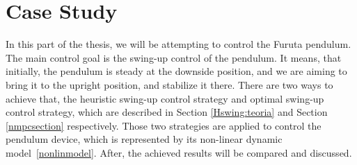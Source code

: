\chapter{Case Study}
In this part of the thesis, we will be attempting to control the Furuta pendulum. The main control goal is the swing-up control of the pendulum. It means, that initially, the pendulum is steady at the downside position, and we are aiming to bring it to the upright position, and stabilize it there. There are two ways to achieve that, the heuristic swing-up control strategy and optimal swing-up control strategy, which are described in Section \ref{Hswing:teoria}  and Section \ref{nmpcsection} respectively. Those two strategies are applied to control the pendulum device, which is represented by its non-linear dynamic model~\ref{nonlinmodel}. After, the achieved results will be compared and discussed.
